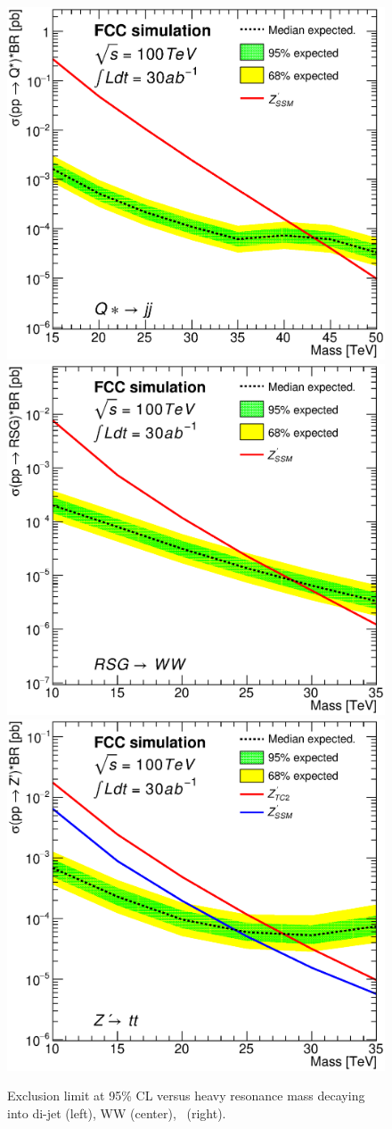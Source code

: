 \documentclass{cernrep}
\begin{document}
\begin{figure}
  \centering
  \includegraphics[width=0.30\columnwidth]{Fig/lim_Qstar_jj_fcc_v02.eps}
  \includegraphics[width=0.30\columnwidth]{Fig/lim_RSGraviton_ww_fcc_v02.eps}
  \includegraphics[width=0.30\columnwidth]{Fig/lim_Zprime_tt_fcc_v02.eps}
  \caption{Exclusion limit at 95\% CL versus heavy resonance mass decaying into di-jet (left), WW (center), \ttbar\ (right).}
  \label{figure:hadronicresonances:limits}
\end{figure}
\end{document}
